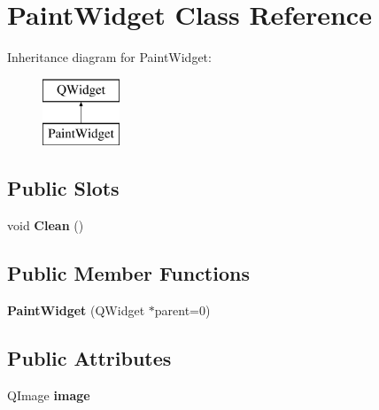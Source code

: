 \hypertarget{class_paint_widget}{}\section{Paint\+Widget Class Reference}
\label{class_paint_widget}
Inheritance diagram for Paint\+Widget\+:\begin{figure}[H]
\begin{center}
\leavevmode
\includegraphics[height=2.000000cm]{class_paint_widget}
\end{center}
\end{figure}
\subsection*{Public Slots}
\begin{DoxyCompactItemize}
\item 
\mbox{\label{class_paint_widget_a5ebf42105842c3f4da64e8482a5a0b74}} 
void {\bfseries Clean} ()
\end{DoxyCompactItemize}
\subsection*{Public Member Functions}
\begin{DoxyCompactItemize}
\item 
\mbox{\label{class_paint_widget_ae6adf05aa99501c9309ca72ccbcafee4}} 
{\bfseries Paint\+Widget} (Q\+Widget $\ast$parent=0)
\end{DoxyCompactItemize}
\subsection*{Public Attributes}
\begin{DoxyCompactItemize}
\item 
\mbox{\label{class_paint_widget_af256e4154c8f1e9cae1016923b40508c}} 
Q\+Image {\bfseries image}
\end{DoxyCompactItemize}
